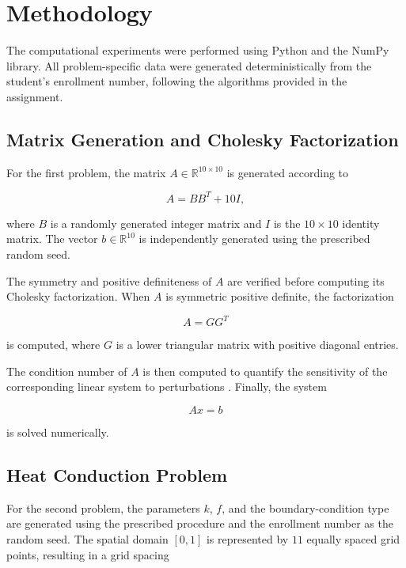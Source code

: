 \section{Methodology}

The computational experiments were performed using Python and the NumPy library.
All problem-specific data were generated deterministically from the student's
enrollment number, following the algorithms provided in the assignment.

\subsection{Matrix Generation and Cholesky Factorization}

For the first problem, the matrix $A\in\mathbb{R}^{10\times10}$ is generated according to

\begin{equation}
    A = BB^{T} + 10I,
\end{equation}

where $B$ is a randomly generated integer matrix and $I$ is the $10\times10$
identity matrix. The vector $b\in\mathbb{R}^{10}$ is independently generated
using the prescribed random seed.

The symmetry and positive definiteness of $A$ are verified before computing its
Cholesky factorization. When $A$ is symmetric positive definite, the
factorization

\begin{equation}
    A = GG^{T}
\end{equation}

is computed, where $G$ is a lower triangular matrix with positive diagonal
entries.

The condition number of $A$ is then computed to quantify the sensitivity of the
corresponding linear system to perturbations \cite{golub2013matrix}. Finally, the system

\begin{equation}
    Ax=b
\end{equation}

is solved numerically.

\subsection{Heat Conduction Problem}

For the second problem, the parameters $k$, $f$, and the boundary-condition type
are generated using the prescribed procedure and the enrollment number as the
random seed. The spatial domain $[0,1]$ is represented by $11$ equally spaced
grid points, resulting in a grid spacing

